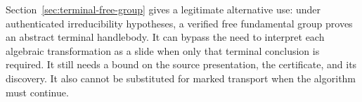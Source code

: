 Section~\ref{sec:terminal-free-group} gives a legitimate alternative
use: under authenticated irreducibility hypotheses, a verified free
fundamental group proves an abstract terminal handlebody.  It can bypass
the need to interpret each algebraic transformation as a slide when only
that terminal conclusion is required.  It still needs a bound on the
source presentation, the certificate, and its discovery.  It also cannot
be substituted for marked transport when the algorithm must continue.
